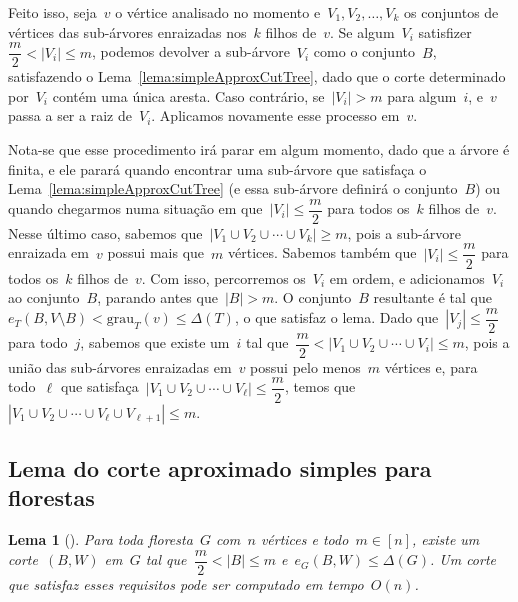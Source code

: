 \documentclass[a4paper,12pt]{article}
\newtheorem{lem}{Lema}
\newcommand{\grau}{\mathrm{grau}}
\begin{document}
	Feito isso, seja~$v$ o vértice analisado no momento 
	e~${V_1, V_2, \ldots, V_k}$ os conjuntos de vértices das
	sub-árvores enraizadas 
	nos~$k$ filhos de~$v$.
	Se algum~$V_i$ satisfizer~${\dfrac{m}{2}<|V_i|\le m}$, podemos 
	devolver a sub-árvore~$V_i$ como o conjunto~$B$, 
	satisfazendo o Lema~\ref{lema:simpleApproxCutTree}, dado que o
	corte determinado por~$V_i$ contém uma única aresta. 
	Caso contrário, se~${|V_i|>m}$ para algum~$i$, 
	e~$v$ passa a ser a raiz de~$V_i$.
	Aplicamos novamente esse processo em~$v$.

	Nota-se que esse procedimento irá parar em algum momento, dado 
	que a árvore é finita, e ele parará quando encontrar uma 
	sub-árvore que satisfaça o Lema~\ref{lema:simpleApproxCutTree}
	(e essa sub-árvore definirá o conjunto~$B$) 
	ou quando chegarmos numa situação em 
	que~${|V_i|\le \dfrac{m}{2}}$ para todos os~$k$ filhos de~$v$.
	Nesse último caso, sabemos 
	que~${|V_1\cup V_2\cup \cdots \cup V_k|\ge m}$, pois
	a sub-árvore enraizada em~$v$ possui mais que~$m$ vértices. 
	Sabemos também que~${|V_i|\le \dfrac{m}{2}}$ para todos os~$k$ 
	filhos de~$v$. 
	Com isso, percorremos os~$V_i$ em ordem, e 
	adicionamos~$V_i$ ao conjunto~$B$, parando antes 
	que~${|B| >m}$. 
	O conjunto~$B$ resultante é tal 
	que~${e_T(B,V\setminus B)<\grau_T(v)\le \Delta(T)}$, 
	o que satisfaz o lema.
	Dado que~${|V_j|\le \dfrac{m}{2}}$ para todo~$j$, sabemos que 
	existe um~$i$ tal 
	que~${\dfrac{m}{2} <|V_1\cup V_2 \cup \cdots \cup V_i|\le m}$, 
	pois a união das sub-árvores enraizadas em~$v$ possui pelo 
	menos~$m$ vértices e, para todo~$\ell$ que 
	satisfaça~${|V_1\cup V_2\cup \cdots\cup V_\ell|\le 
	\dfrac{m}{2}}$, temos 
	que~${|V_1\cup V_2\cup\cdots\cup V_\ell\cup V_{\ell+1}|\le m}$.


\bigskip
\bigskip
\bigskip


\subsection{Lema do corte aproximado simples para florestas}

\begin{lem}[{\cite[Lema 2]{Schmidt15}}]
\label{lema:simpleApproxCutForest}
	Para toda floresta~$G$ com~$n$ vértices e todo~${m \in [n]}$,
	existe um corte~$(B,W)$ em~$G$ tal 
	que~${\dfrac{m}{2} <|B| \le m}$ e~${e_G(B,W) \le \Delta(G)}$.
	Um corte que satisfaz esses requisitos pode ser computado em
	tempo~$O(n)$.
\end{lem}
\end{document}
